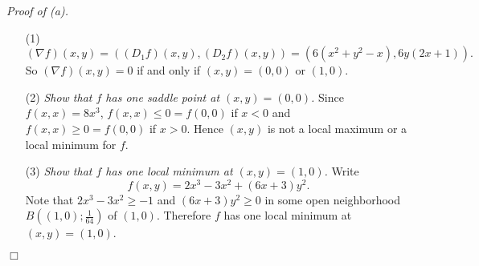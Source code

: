 \documentclass{article}
\begin{document}
\emph{Proof of (a).}
\begin{enumerate}
\item[(1)]
  \[
    (\nabla f)(x,y)
    = ((D_1 f)(x,y), (D_2 f)(x,y))
    = (6(x^2+y^2-x), 6y(2x+1)).
  \]
  So $(\nabla f)(x,y) = 0$ if and only if
  $(x,y) = (0,0)$ or $(1,0)$.

\item[(2)]
  \emph{Show that $f$ has one saddle point at $(x,y) = (0,0)$.}
  Since $f(x,x) = 8x^3$,
  $f(x,x) \leq 0 = f(0,0)$ if $x < 0$
  and $f(x,x) \geq 0 = f(0,0)$ if $x > 0$.
  Hence $(x,y)$ is not a local maximum or a local minimum for $f$.

\item[(3)]
  \emph{Show that $f$ has one local minimum at $(x,y) = (1,0)$.}
  Write
  \[
    f(x,y) = 2x^3-3x^2 + (6x+3)y^2.
  \]
  Note that $2x^3-3x^2 \geq -1$ and $(6x+3)y^2 \geq 0$
  in some open neighborhood $B\left((1,0);\frac{1}{64}\right)$ of $(1,0)$.
  Therefore $f$ has one local minimum at $(x,y) = (1,0)$.
\end{enumerate}
$\Box$ \\
\end{document}
